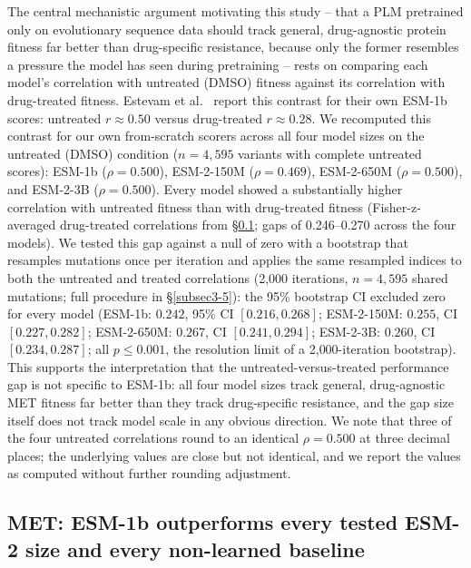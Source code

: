 \documentclass[pdflatex,sn-mathphys-num]{sn-jnl}%
\theoremstyle{thmstyleone}%
\theoremstyle{thmstyletwo}%
\theoremstyle{thmstylethree}%
\begin{document}
The central mechanistic argument motivating this study -- that a PLM pretrained only on evolutionary sequence data should track general, drug-agnostic protein fitness far better than drug-specific resistance, because only the former resembles a pressure the model has seen during pretraining -- rests on comparing each model's correlation with untreated (DMSO) fitness against its correlation with drug-treated fitness. Estevam et al.\ \citep{Estevam2025} report this contrast for their own ESM-1b scores: untreated $r \approx 0.50$ versus drug-treated $r \approx 0.28$. We recomputed this contrast for our own from-scratch scorers across all four model sizes on the untreated (DMSO) condition ($n=4{,}595$ variants with complete untreated scores): ESM-1b ($\rho=0.500$), ESM-2-150M ($\rho=0.469$), ESM-2-650M ($\rho=0.500$), and ESM-2-3B ($\rho=0.500$). Every model showed a substantially higher correlation with untreated fitness than with drug-treated fitness (Fisher-z-averaged drug-treated correlations from \S\ref{subsec2-2}; gaps of 0.246--0.270 across the four models). We tested this gap against a null of zero with a bootstrap that resamples mutations once per iteration and applies the same resampled indices to both the untreated and treated correlations (2{,}000 iterations, $n=4{,}595$ shared mutations; full procedure in \S\ref{subsec3-5}): the 95\% bootstrap CI excluded zero for every model (ESM-1b: $0.242$, 95\% CI $[0.216, 0.268]$; ESM-2-150M: $0.255$, CI $[0.227, 0.282]$; ESM-2-650M: $0.267$, CI $[0.241, 0.294]$; ESM-2-3B: $0.260$, CI $[0.234, 0.287]$; all $p \leq 0.001$, the resolution limit of a 2{,}000-iteration bootstrap). This supports the interpretation that the untreated-versus-treated performance gap is not specific to ESM-1b: all four model sizes track general, drug-agnostic MET fitness far better than they track drug-specific resistance, and the gap size itself does not track model scale in any obvious direction. We note that three of the four untreated correlations round to an identical $\rho=0.500$ at three decimal places; the underlying values are close but not identical, and we report the values as computed without further rounding adjustment.

\subsection{MET: ESM-1b outperforms every tested ESM-2 size and every non-learned baseline}\label{subsec2-2}
\end{document}

